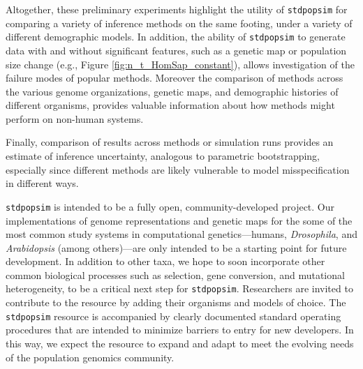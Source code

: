 \documentclass[12pt,halfline,a4paper]{ouparticle}
\newcommand{\stdpopsim}{\texttt{stdpopsim}\xspace}
\newcommand{\adk}[1]{\textcolor{red}{ADK: #1}}
\begin{document}
Altogether, these preliminary experiments highlight
the utility of \stdpopsim for comparing a variety of inference methods on
the same footing, under a variety of different demographic models.
In addition, the ability of \stdpopsim to generate data with and without significant features, such
as a genetic map or population size change (e.g., Figure \ref{fig:n_t_HomSap_constant}), allows
investigation of the failure modes of popular methods.
Moreover the comparison of methods across the various genome organizations, genetic maps,
and demographic histories of different organisms, provides valuable information
about how methods might perform on non-human systems.

Finally, comparison of results across methods or simulation runs
provides an estimate of inference uncertainty, analogous to parametric
bootstrapping,
especially since different methods are likely vulnerable to model misspecification
in different ways.

\stdpopsim is intended to be a fully open, community-developed project.  
Our implementations of genome representations and genetic maps for the some of
the most common study systems in computational genetics---humans, \textit{Drosophila},
and \textit{Arabidopsis} (among others)---are only intended to be a starting point for
future development.  In addition to other taxa,
we hope to soon incorporate other common biological processes
such as selection, gene conversion, and mutational heterogeneity, 
to be a critical next step for \stdpopsim. 
Researchers are invited to contribute to the resource by adding their
organisms and models of choice. The \stdpopsim resource is
accompanied by clearly documented standard operating procedures that are
intended to minimize barriers to entry for new developers.  In this way, we
expect the resource to expand and adapt to meet the evolving needs of the
population genomics community.  

\end{document}
